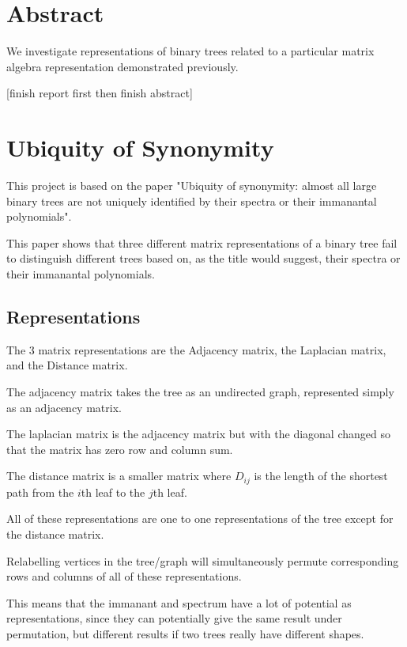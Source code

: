 \documentclass{report}
\begin{document}
\newtheorem{definition}{Definition}

\section{Abstract}

We investigate representations of binary trees related to a particular matrix
algebra representation demonstrated previously.

[finish report first then finish abstract]

\section{Ubiquity of Synonymity}

This project is based on the paper "Ubiquity of synonymity: almost all large binary trees are not uniquely identified by their spectra or their immanantal polynomials".

This paper shows that three different matrix representations of a binary tree fail to distinguish different trees based on, as the title would suggest, their spectra or their immanantal polynomials.

\subsection{Representations}

The 3 matrix representations are the Adjacency matrix, the Laplacian matrix, and the Distance matrix.

The adjacency matrix takes the tree as an undirected graph, represented simply as an adjacency matrix.

The laplacian matrix is the adjacency matrix but with the diagonal changed so that the matrix has zero row and column sum.

The distance matrix is a smaller matrix where $D_{ij}$ is the length of the shortest path from the $i$th leaf to the $j$th leaf.

All of these representations are one to one representations of the tree except for the distance matrix.

Relabelling vertices in the tree/graph will simultaneously permute corresponding rows and columns of all of these representations.

This means that the immanant and spectrum have a lot of potential as representations, since they can potentially give the same result under permutation, but different results if two trees really have different shapes.
\end{document}
